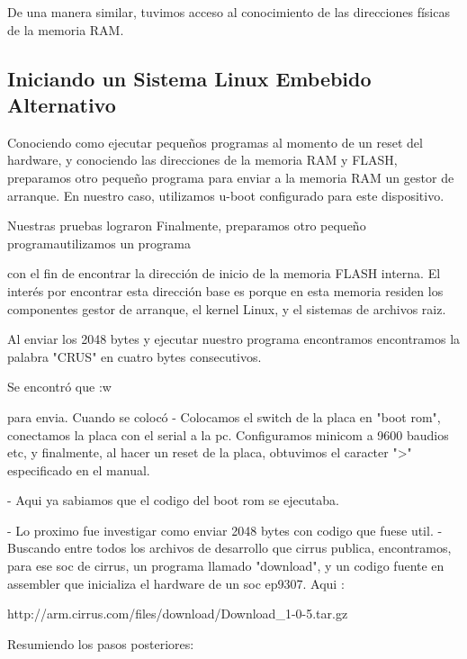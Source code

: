 \documentclass[conference]{IEEEtran}
\begin{document}
De una manera similar, tuvimos acceso al conocimiento de
las direcciones físicas de la memoria RAM.

\subsection{Iniciando un Sistema Linux Embebido Alternativo}

Conociendo como ejecutar pequeños programas al momento de un reset
del hardware, y conociendo las direcciones de la memoria RAM y FLASH,
preparamos otro pequeño programa para enviar a la memoria RAM un gestor
de arranque. En nuestro caso, utilizamos u-boot configurado para 
este dispositivo.

Nuestras pruebas lograron
Finalmente, preparamos otro pequeño programautilizamos un programa

con el fin de encontrar la dirección de inicio
de la memoria FLASH interna. El interés por encontrar esta dirección
base es porque en esta memoria residen los componentes
gestor de arranque, el kernel Linux, y el sistemas de archivos raiz.

Al enviar los 2048 bytes y ejecutar nuestro programa encontramos 
encontramos la palabra "CRUS" en cuatro bytes consecutivos.


Se encontró que :w


para envia.
Cuando se colocó - Colocamos el switch de la placa en "boot rom", conectamos la placa con el serial
a la pc. Configuramos minicom a 9600 baudios etc, y finalmente, al hacer un 
reset de la placa, obtuvimos el caracter ">" especificado en el manual.

- Aqui ya sabiamos que el codigo del boot rom se ejecutaba. 

- Lo proximo fue investigar como enviar 2048 bytes con codigo que fuese util.
- Buscando entre todos los archivos de desarrollo que cirrus publica,
  encontramos, para ese soc de cirrus, un programa llamado "download", y un codigo fuente en assembler
  que inicializa el hardware de un soc ep9307. Aqui :

http://arm.cirrus.com/files/download/Download_1-0-5.tar.gz

Resumiendo los pasos posteriores:
\end{document}
